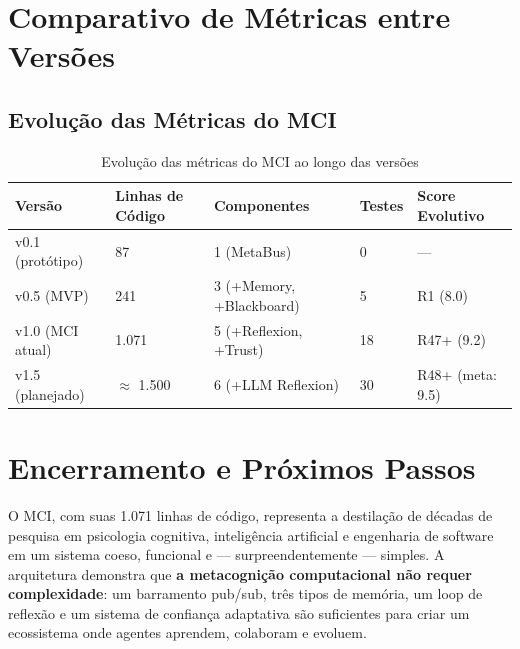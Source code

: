 \section{Comparativo de Métricas entre Versões}
\label{sec:version-metrics}

\subsection{Evolução das Métricas do MCI}

\begin{table}[htbp]
\centering
\caption{Evolução das métricas do MCI ao longo das versões}
\label{tab:version-evolution}
\begin{tabular}{@{}p{2cm}p{3cm}p{3cm}p{3cm}p{3cm}@{}}
\toprule
\textbf{Versão} & \textbf{Linhas de Código} & \textbf{Componentes} & \textbf{Testes} & \textbf{Score Evolutivo} \\
\midrule
v0.1 (protótipo) & 87 & 1 (MetaBus) & 0 & — \\
v0.5 (MVP) & 241 & 3 (+Memory, +Blackboard) & 5 & R1 (8.0) \\
v1.0 (MCI atual) & 1.071 & 5 (+Reflexion, +Trust) & 18 & R47+ (9.2) \\
v1.5 (planejado) & $\approx$ 1.500 & 6 (+LLM Reflexion) & 30 & R48+ (meta: 9.5) \\
\bottomrule
\end{tabular}
\end{table}

\section{Encerramento e Próximos Passos}
\label{sec:next-steps}

O MCI, com suas 1.071 linhas de código, representa a destilação de décadas de pesquisa em psicologia cognitiva, inteligência artificial e engenharia de software em um sistema coeso, funcional e — surpreendentemente — simples. A arquitetura demonstra que \textbf{a metacognição computacional não requer complexidade}: um barramento pub/sub, três tipos de memória, um loop de reflexão e um sistema de confiança adaptativa são suficientes para criar um ecossistema onde agentes aprendem, colaboram e evoluem.

